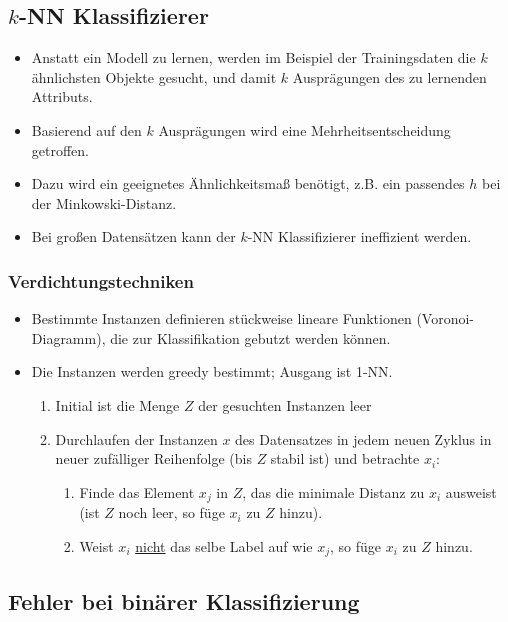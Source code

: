 \documentclass{scrartcl}
\begin{document}
\subsection{$ k $-NN Klassifizierer}

\begin{itemize}
	\item Anstatt ein Modell zu lernen, werden im Beispiel der Trainingsdaten 
	die $ k $ ähnlichsten Objekte gesucht, und damit $ k $ Ausprägungen des zu 
	lernenden Attributs.
	\item Basierend auf den $ k $ Ausprägungen wird eine Mehrheitsentscheidung 
	getroffen.
	\item Dazu wird ein geeignetes Ähnlichkeitsmaß benötigt, z.B. ein passendes 
	$ h $ bei der Minkowski-Distanz.
	\item Bei großen Datensätzen kann der $ k $-NN Klassifizierer ineffizient 
	werden.
\end{itemize}

\subsubsection{Verdichtungstechniken}

\begin{itemize}
	\item Bestimmte Instanzen definieren stückweise lineare Funktionen 
	(Voronoi-Diagramm), die zur Klassifikation gebutzt werden können.
	\item Die Instanzen werden greedy bestimmt; Ausgang ist 1-NN.
	\begin{enumerate}
		\item Initial ist die Menge $ Z $ der gesuchten Instanzen leer
		\item Durchlaufen der Instanzen $ x $ des Datensatzes in jedem neuen 
		Zyklus in neuer zufälliger Reihenfolge (bis $ Z $ stabil ist) und 
		betrachte $ x_i $:
		\begin{enumerate}
			\item Finde das Element $ x_j $ in $ Z $, das die minimale Distanz 
			zu $ x_i $ ausweist (ist $ Z $ noch leer, so füge $ x_i $ zu $ Z $ 
			hinzu).
			\item Weist $ x_i $ \underline{nicht} das selbe Label auf wie $ x_j 
			$, so füge $ x_i $ zu $ Z $ hinzu.
		\end{enumerate}
	\end{enumerate}
\end{itemize}

\subsection{Fehler bei binärer Klassifizierung}
\end{document}
